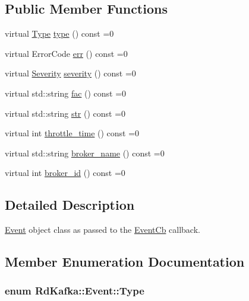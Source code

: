 \subsection*{Public Member Functions}
\begin{DoxyCompactItemize}
\item 
virtual \hyperlink{classRdKafka_1_1Event_ab087b57a8ddf5c46d722999a010b8f25}{Type} \hyperlink{classRdKafka_1_1Event_a8bf41860541c6549cccd298b0a4ceb6e}{type} () const =0
\item 
virtual ErrorCode \hyperlink{classRdKafka_1_1Event_a6631f15dccbf775a3fa43a1aba8828ab}{err} () const =0
\item 
virtual \hyperlink{classRdKafka_1_1Event_a97aab314006c6c1a82dcd341e5c0e6d3}{Severity} \hyperlink{classRdKafka_1_1Event_ab98e758dea9aa13eb1421f625e206b16}{severity} () const =0
\item 
virtual std::string \hyperlink{classRdKafka_1_1Event_a60dbe2545a614b2706594d384156dfa4}{fac} () const =0
\item 
virtual std::string \hyperlink{classRdKafka_1_1Event_a94f84a103b017b21d7ede84fbbf9d7ed}{str} () const =0
\item 
virtual int \hyperlink{classRdKafka_1_1Event_a21be0397c0bc18657d90341a1eeb1db5}{throttle\_\-time} () const =0
\item 
virtual std::string \hyperlink{classRdKafka_1_1Event_a3295812d6be66d4f601ca7055a26f9ef}{broker\_\-name} () const =0
\item 
virtual int \hyperlink{classRdKafka_1_1Event_ac4355a247e321448d3ae29655da7b724}{broker\_\-id} () const =0
\end{DoxyCompactItemize}


\subsection{Detailed Description}
\hyperlink{classRdKafka_1_1Event}{Event} object class as passed to the \hyperlink{classRdKafka_1_1EventCb}{EventCb} callback. 

\subsection{Member Enumeration Documentation}
\hypertarget{classRdKafka_1_1Event_ab087b57a8ddf5c46d722999a010b8f25}{
\subsubsection[{Type}]{\setlength{\rightskip}{0pt plus 5cm}enum {\bf RdKafka::Event::Type}}}
\label{classRdKafka_1_1Event_ab087b57a8ddf5c46d722999a010b8f25}


